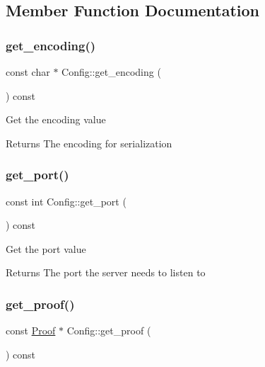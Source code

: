 \subsection{Member Function Documentation}
\mbox{\label{classConfig_a23f39330cd594b8855d371368adc80e4}} 
\subsubsection{\texorpdfstring{get\+\_\+encoding()}{get\_encoding()}}
{\footnotesize\ttfamily const char $\ast$ Config\+::get\+\_\+encoding (\begin{DoxyParamCaption}{ }\end{DoxyParamCaption}) const\hspace{0.3cm}{\ttfamily [virtual]}}

Get the encoding value

\begin{DoxyReturn}{Returns}
The encoding for serialization 
\end{DoxyReturn}
\mbox{\label{classConfig_a516e5e6665ad519ab23ac4c57fb99cb6}} 
\subsubsection{\texorpdfstring{get\+\_\+port()}{get\_port()}}
{\footnotesize\ttfamily const int Config\+::get\+\_\+port (\begin{DoxyParamCaption}{ }\end{DoxyParamCaption}) const\hspace{0.3cm}{\ttfamily [virtual]}}

Get the port value

\begin{DoxyReturn}{Returns}
The port the server needs to listen to 
\end{DoxyReturn}
\mbox{\label{classConfig_a23b6ece178053913f232eeda4ab7c7c8}} 
\subsubsection{\texorpdfstring{get\+\_\+proof()}{get\_proof()}}
{\footnotesize\ttfamily const \mbox{\hyperlink{classProof}{Proof}} $\ast$ Config\+::get\+\_\+proof (\begin{DoxyParamCaption}{ }\end{DoxyParamCaption}) const\hspace{0.3cm}{\ttfamily [virtual]}}


